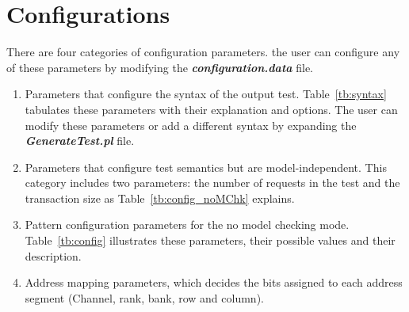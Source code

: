 \section{Configurations}

There are four categories of configuration parameters. 
the user can configure any of these parameters by modifying the \textbf{\textit{configuration.data}} file. 

\begin{enumerate}
\item Parameters that configure the syntax of the output test. 
Table~\ref{tb:syntax} tabulates these parameters with their explanation and options. 
The user can modify these parameters or add a different syntax by expanding the \textit{\textbf{GenerateTest.pl}} file. 

\item Parameters that configure test semantics but are model-independent. 
This category includes two parameters: the number of requests in the test and the transaction size as Table~\ref{tb:config_noMChk} explains.

\item Pattern configuration parameters for the no model checking mode. 
Table~\ref{tb:config} illustrates these parameters, their possible values and their description. 

\item Address mapping parameters, which decides the bits assigned to each address segment (Channel, rank, bank, row and column). 

\end{enumerate}

  




